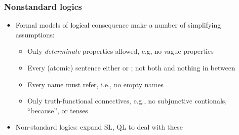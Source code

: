 \begin{frame}
    \frametitle{Nonstandard logics}

\begin{itemize}[<+->]
\item Formal models of logical consequence make a number of simplifying assumptions:
\begin{itemize}[<+->]
\item Only \emph{determinate} properties allowed, e.g, no vague properties
\item Every (atomic) sentence either \True{} or \False; not both and nothing in between
\item Every name must refer, i.e., no empty names
\item Only truth-functional connectives, e.g., no subjunctive contionals, ``because'', or tenses
\end{itemize}
\item Non-standard logics: expand SL, QL to deal with these
\end{itemize}

\end{frame}


